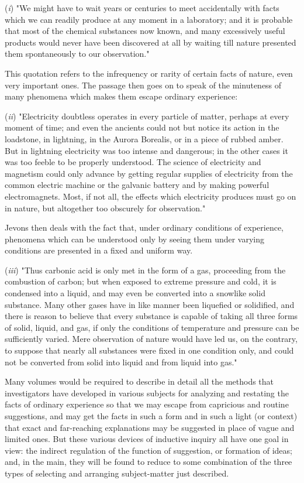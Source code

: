 \documentclass[letterpaper]{book}
\begin{document}
(\emph{i}) "We might have to wait years or centuries to
meet
accidentally with facts which we can readily produce at any moment in a
laboratory; and it is probable that most of the chemical substances now
known, and many excessively useful products would never have been
discovered at all by waiting till nature presented them spontaneously to
our observation."

This quotation refers to the infrequency or rarity of certain facts of
nature, even very important ones. The passage then goes on to speak of
the minuteness of many phenomena which makes them escape ordinary
experience:

(\emph{ii}) "Electricity doubtless operates in every particle of matter,
perhaps at every moment of time; and even the ancients could not but
notice its action in the loadstone, in lightning, in the Aurora
Borealis, or in a piece of rubbed amber. But in lightning electricity
was too intense and dangerous; in the other cases it was too feeble to
be properly understood. The science of electricity and magnetism could
only advance by getting regular supplies of electricity from the common
electric machine or the galvanic battery and by making powerful
electromagnets. Most, if not all, the effects which electricity produces
must go on in nature, but altogether too obscurely for observation."

Jevons then deals with the fact that, under ordinary conditions of
experience, phenomena which can be understood only by seeing them under
varying conditions are presented in a fixed and uniform way.

(\emph{iii}) "Thus carbonic acid is only met in the form of a gas,
proceeding from the combustion of carbon; but when exposed to extreme
pressure and cold, it is condensed into a liquid, and may even be
converted into a snowlike solid substance. Many other gases have
in
like manner been liquefied or solidified, and there is reason to believe
that every substance is capable of taking all three forms of solid,
liquid, and gas, if only the conditions of temperature and pressure can
be sufficiently varied. Mere observation of nature would have led us, on
the contrary, to suppose that nearly all substances were fixed in one
condition only, and could not be converted from solid into liquid and
from liquid into gas."

Many volumes would be required to describe in detail all the methods
that investigators have developed in various subjects for analyzing and
restating the facts of ordinary experience so that we may escape from
capricious and routine suggestions, and may get the facts in such a form
and in such a light (or context) that exact and far-reaching
explanations may be suggested in place of vague and limited ones. But
these various devices of inductive inquiry all have one goal in view:
the indirect regulation of the function of suggestion, or formation of
ideas; and, in the main, they will be found to reduce to some
combination of the three types of selecting and arranging subject-matter
just described.
\end{document}
